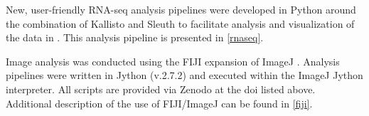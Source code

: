 New, user\hyp{}friendly RNA\hyp{}seq analysis pipelines were developed in Python around the combination of Kallisto \citep{Bray2016} and Sleuth \citep{Pimentel2017} to facilitate analysis and visualization of the data in \citet{Saelens2022}. This analysis pipeline is presented in \autoref{rnaseq}.

Image analysis was conducted using the FIJI \citep{Schindelin2012, Rueden2017} expansion of ImageJ \citep{Schneider2012}. Analysis pipelines were written in Jython (v.2.7.2) \citep{vanRossum1995} and executed within the ImageJ Jython interpreter. All scripts are provided via Zenodo at the doi listed above. Additional description of the use of FIJI/ImageJ can be found in \autoref{fiji}.

